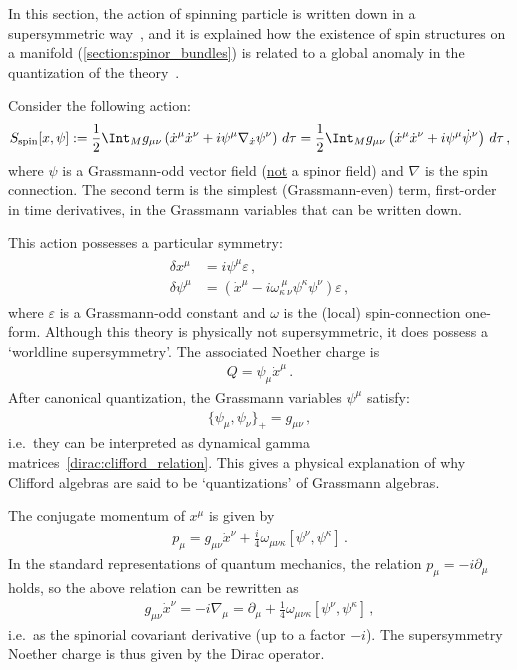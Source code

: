     In this section, the action of spinning particle is written down in a supersymmetric way~\citep{berezin_particle_1977}, and it is explained how the existence of spin structures on a manifold (\cref{section:spinor_bundles}) is related to a global anomaly in the quantization of the theory~\citep{witten_global_1985}.

    Consider the following action:
    \begin{gather}
        S_{\text{spin}}[x,\psi] := \frac{1}{2}\Int_Mg_{\mu\nu}\left(\dot{x}^\mu\dot{x}^\nu + i\psi^\mu\nabla_{\dot{x}}\psi^\nu\right)\,d\tau = \frac{1}{2}\Int_Mg_{\mu\nu}\left(\dot{x}^\mu\dot{x}^\nu + i\psi^\mu\dot{\psi}^\nu\right)\,d\tau\,,
    \end{gather}
    where $\psi$ is a Grassmann-odd vector field (\underline{not} a spinor field) and $\nabla$ is the spin connection. The second term is the simplest (Grassmann-even) term, first-order in time derivatives, in the Grassmann variables that can be written down.

    This action possesses a particular symmetry:
    \begin{gather}
        \begin{aligned}
            \delta x^\mu &= i\psi^\mu\varepsilon\,,\\
            \delta\psi^\mu &= \left(\dot{x}^\mu - i\omega^{\ \mu\ }_{\kappa\ \nu}\psi^\kappa\psi^\nu\right)\varepsilon\,,
        \end{aligned}
    \end{gather}
    where $\varepsilon$ is a Grassmann-odd constant and $\omega$ is the (local) spin-connection one-form. Although this theory is physically not supersymmetric, it does possess a `worldline supersymmetry'. The associated Noether charge is
    \begin{gather}
        Q = \psi_\mu\dot{x}^\mu\,.
    \end{gather}
    After canonical quantization, the Grassmann variables $\psi^\mu$ satisfy:
    \begin{gather}
        \{\psi_\mu,\psi_\nu\}_+ = g_{\mu\nu}\,,
    \end{gather}
    i.e.~they can be interpreted as dynamical gamma matrices~\eqref{dirac:clifford_relation}. This gives a physical explanation of why Clifford algebras are said to be `quantizations' of Grassmann algebras.

    The conjugate momentum of $x^\mu$ is given by
    \begin{gather}
        p_\mu = g_{\mu\nu}\dot{x}^\nu + \frac{i}{4}\omega_{\mu\nu\kappa}[\psi^\nu,\psi^\kappa]\,.
    \end{gather}
    In the standard representations of quantum mechanics, the relation $p_\mu = -i\partial_\mu$ holds, so the above relation can be rewritten as
    \begin{gather}
        g_{\mu\nu}\dot{x}^\nu = -i\nabla_\mu = \partial_\mu + \frac{1}{4}\omega_{\mu\nu\kappa}[\psi^\nu,\psi^\kappa]\,,
    \end{gather}
    i.e.~as the spinorial covariant derivative (up to a factor $-i$). The supersymmetry Noether charge is thus given by the Dirac operator.

